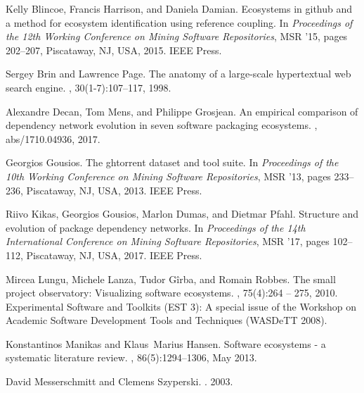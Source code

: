 \documentclass[10pt,conference]{IEEEtran}
\begin{document}
\begin{thebibliography}{10}

  Kelly Blincoe, Francis Harrison, and Daniela Damian.
  \newblock Ecosystems in github and a method for ecosystem identification using
  reference coupling.
  \newblock In {\em Proceedings of the 12th Working Conference on Mining Software
  Repositories}, MSR '15, pages 202--207, Piscataway, NJ, USA, 2015. IEEE
  Press.

  Sergey Brin and Lawrence Page.
  \newblock The anatomy of a large-scale hypertextual web search engine.
  , 30(1-7):107--117, 1998.

  Alexandre Decan, Tom Mens, and Philippe Grosjean.
  \newblock An empirical comparison of dependency network evolution in seven
  software packaging ecosystems.
  , abs/1710.04936, 2017.

  Georgios Gousios.
  \newblock The ghtorrent dataset and tool suite.
  \newblock In {\em Proceedings of the 10th Working Conference on Mining Software
  Repositories}, MSR '13, pages 233--236, Piscataway, NJ, USA, 2013. IEEE
  Press.

  Riivo Kikas, Georgios Gousios, Marlon Dumas, and Dietmar Pfahl.
  \newblock Structure and evolution of package dependency networks.
  \newblock In {\em Proceedings of the 14th International Conference on Mining
  Software Repositories}, MSR '17, pages 102--112, Piscataway, NJ, USA, 2017.
  IEEE Press.

  Mircea Lungu, Michele Lanza, Tudor Gîrba, and Romain Robbes.
  \newblock The small project observatory: Visualizing software ecosystems.
  , 75(4):264 -- 275, 2010.
  \newblock Experimental Software and Toolkits (EST 3): A special issue of the
  Workshop on Academic Software Development Tools and Techniques (WASDeTT
  2008).

  Konstantinos Manikas and Klaus~Marius Hansen.
  \newblock Software ecosystems - a systematic literature review.
  , 86(5):1294--1306, May 2013.

  David Messerschmitt and Clemens Szyperski.
  .
   2003.


\end{thebibliography}
\end{document}
